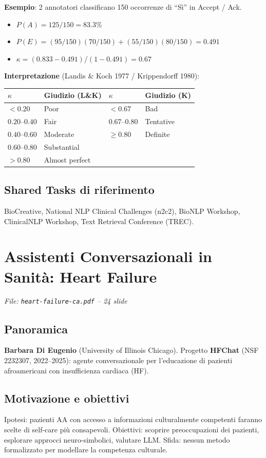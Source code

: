 \documentclass[a4paper,12pt]{article}
\begin{document}
\textbf{Esempio}: 2 annotatori classificano 150 occorrenze di ``S\`i'' in Accept / Ack.
\begin{itemize}
    \item $P(A) = 125/150 = 83.3\%$
    \item $P(E) = (95/150)(70/150) + (55/150)(80/150) = 0.491$
    \item $\kappa = (0.833 - 0.491) / (1 - 0.491) = 0.67$
\end{itemize}

\textbf{Interpretazione} (Landis \& Koch 1977 / Krippendorff 1980):
\begin{center}
\begin{tabular}{ll|ll}
\toprule
$\kappa$ & Giudizio (L\&K) & $\kappa$ & Giudizio (K) \\
\midrule
$< 0.20$ & Poor & $< 0.67$ & Bad \\
$0.20$--$0.40$ & Fair & $0.67$--$0.80$ & Tentative \\
$0.40$--$0.60$ & Moderate & $\geq 0.80$ & Definite \\
$0.60$--$0.80$ & Substantial & & \\
$> 0.80$ & Almost perfect & & \\
\bottomrule
\end{tabular}
\end{center}

\subsection{Shared Tasks di riferimento}
BioCreative, National NLP Clinical Challenges (n2c2), BioNLP Workshop, ClinicalNLP Workshop, Text Retrieval Conference (TREC).

\section{Assistenti Conversazionali in Sanit\`a: Heart Failure}
\textit{File: \texttt{heart-failure-ca.pdf} -- 24 slide}

\subsection{Panoramica}
\textbf{Barbara Di Eugenio} (University of Illinois Chicago). Progetto \textbf{HFChat} (NSF 2232307, 2022--2025): agente conversazionale per l'educazione di pazienti afroamericani con insufficienza cardiaca (HF).

\subsection{Motivazione e obiettivi}
Ipotesi: pazienti AA con accesso a informazioni culturalmente competenti faranno scelte di self-care pi\`u consapevoli. Obiettivi: scoprire preoccupazioni dei pazienti, esplorare approcci neuro-simbolici, valutare LLM. Sfida: nessun metodo formalizzato per modellare la competenza culturale.
\end{document}
